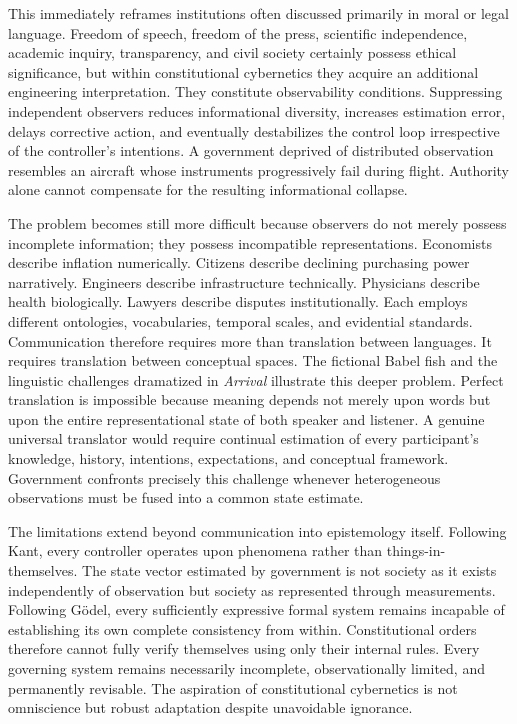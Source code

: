 \documentclass[12pt,a4paper]{article}
\begin{document}
This immediately reframes institutions often discussed primarily in moral or legal language. Freedom of speech, freedom of the press, scientific independence, academic inquiry, transparency, and civil society certainly possess ethical significance, but within constitutional cybernetics they acquire an additional engineering interpretation. They constitute observability conditions. Suppressing independent observers reduces informational diversity, increases estimation error, delays corrective action, and eventually destabilizes the control loop irrespective of the controller's intentions. A government deprived of distributed observation resembles an aircraft whose instruments progressively fail during flight. Authority alone cannot compensate for the resulting informational collapse.

The problem becomes still more difficult because observers do not merely possess incomplete information; they possess incompatible representations. Economists describe inflation numerically. Citizens describe declining purchasing power narratively. Engineers describe infrastructure technically. Physicians describe health biologically. Lawyers describe disputes institutionally. Each employs different ontologies, vocabularies, temporal scales, and evidential standards. Communication therefore requires more than translation between languages. It requires translation between conceptual spaces. The fictional Babel fish and the linguistic challenges dramatized in \emph{Arrival} illustrate this deeper problem. Perfect translation is impossible because meaning depends not merely upon words but upon the entire representational state of both speaker and listener. A genuine universal translator would require continual estimation of every participant's knowledge, history, intentions, expectations, and conceptual framework. Government confronts precisely this challenge whenever heterogeneous observations must be fused into a common state estimate.

The limitations extend beyond communication into epistemology itself. Following Kant, every controller operates upon phenomena rather than things-in-themselves. The state vector estimated by government is not society as it exists independently of observation but society as represented through measurements. Following Gödel, every sufficiently expressive formal system remains incapable of establishing its own complete consistency from within. Constitutional orders therefore cannot fully verify themselves using only their internal rules. Every governing system remains necessarily incomplete, observationally limited, and permanently revisable. The aspiration of constitutional cybernetics is not omniscience but robust adaptation despite unavoidable ignorance.
\end{document}
